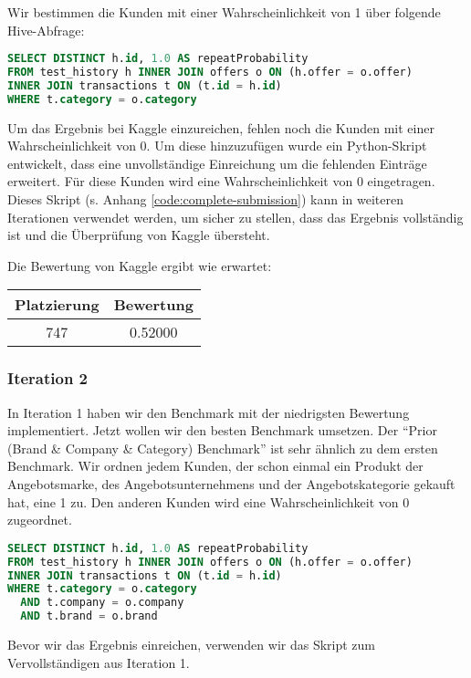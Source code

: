 Wir bestimmen die Kunden mit einer Wahrscheinlichkeit von 1 über folgende Hive-Abfrage:
\begin{lstlisting}[language=SQL]
SELECT DISTINCT h.id, 1.0 AS repeatProbability
FROM test_history h INNER JOIN offers o ON (h.offer = o.offer)
INNER JOIN transactions t ON (t.id = h.id)
WHERE t.category = o.category
\end{lstlisting}

Um das Ergebnis bei Kaggle einzureichen, fehlen noch die Kunden mit einer Wahrscheinlichkeit von 0.
Um diese hinzuzufügen wurde ein Python-Skript entwickelt, dass eine unvollständige Einreichung
um die fehlenden Einträge erweitert. Für diese Kunden wird eine Wahrscheinlichkeit von 0 eingetragen.
Dieses Skript (s. Anhang \ref{code:complete-submission}) kann in weiteren Iterationen verwendet werden,
um sicher zu stellen, dass das Ergebnis vollständig ist und die Überprüfung von Kaggle übersteht. 

Die Bewertung von Kaggle ergibt wie erwartet:

\begin{tabular}{|c|c|}
	\hline \textbf{Platzierung} & \textbf{Bewertung} \\ 
	\hline 747 & 0.52000  \\ 
	\hline 
\end{tabular}

\subsubsection{Iteration 2}

In Iteration 1 haben wir den Benchmark mit der niedrigsten Bewertung implementiert. Jetzt wollen wir 
den besten Benchmark umsetzen. Der "`Prior (Brand \& Company \& Category) Benchmark"' ist sehr ähnlich
zu dem ersten Benchmark. Wir ordnen jedem Kunden, der schon einmal ein Produkt der Angebotsmarke,
des Angebotsunternehmens und der Angebotskategorie gekauft hat, eine 1 zu. Den anderen Kunden wird
eine Wahrscheinlichkeit von 0 zugeordnet.

\begin{lstlisting}[language=SQL]
SELECT DISTINCT h.id, 1.0 AS repeatProbability
FROM test_history h INNER JOIN offers o ON (h.offer = o.offer)
INNER JOIN transactions t ON (t.id = h.id)
WHERE t.category = o.category
  AND t.company = o.company
  AND t.brand = o.brand
\end{lstlisting}

Bevor wir das Ergebnis einreichen, verwenden wir das Skript zum Vervollständigen aus Iteration 1.

